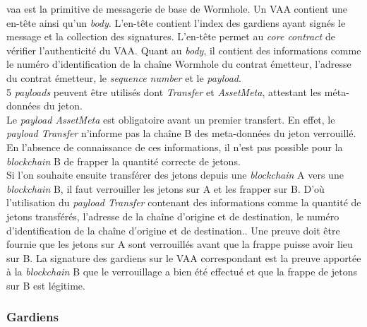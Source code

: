 \acrshort{vaa} \cite{wormholeVAA} est la primitive de messagerie de base de \gls{Wormhole}. Un VAA contient une en-tête 
ainsi qu'un \textit{body}. L'en-tête contient l'index des gardiens ayant signés le message et la collection des signatures.
L'en-tête permet au \textit{core contract} de vérifier l'authenticité du VAA.
Quant au \textit{body}, il contient des informations comme le numéro d'identification de la chaîne 
\gls{Wormhole} du contrat émetteur, l'adresse du contrat émetteur, le \textit{sequence number} 
et le \textit{payload}.\\ 5 \textit{payloads} peuvent être utilisés dont \textit{Transfer} et 
\textit{AssetMeta}, attestant les méta-données du jeton.\\
Le \textit{payload AssetMeta} est obligatoire avant un premier transfert.
En effet, le \textit{payload Transfer} n'informe pas la chaîne B des meta-données du jeton verrouillé.
En l'absence de connaissance de ces informations, il n'est pas possible pour la \textit{\gls{blockchain}} B 
de frapper la quantité correcte de jetons.\\
Si l'on souhaite ensuite transférer des jetons depuis une \textit{\gls{blockchain}} A vers une 
\textit{\gls{blockchain}} B, il faut verrouiller les jetons sur A et les frapper sur B.
D'où l'utilisation du \textit{payload Transfer} contenant des informations comme la 
quantité de jetons transférés, l'adresse de la chaîne d'origine et de destination, 
le numéro d'identification de la chaîne d'origine et de destination..
Une preuve doit être fournie que les jetons sur A sont verrouillés avant que la frappe puisse 
avoir lieu sur B. La signature des gardiens sur le VAA correspondant est la preuve apportée à 
la \textit{\gls{blockchain}} B que le verrouillage a bien été effectué et que la frappe de jetons sur 
B est légitime.

\subsubsection{Gardiens}

